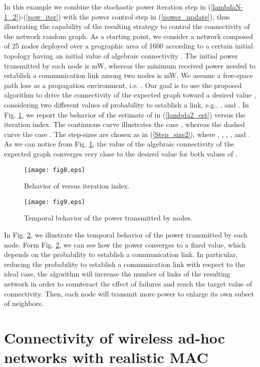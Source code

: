 \documentclass[10pt,twocolumn]{IEEEtran}
\begin{document}
 In this example we combine the stochastic power iteration step in (\ref{lambdaN-1_2})-(\ref{pow_iter}) with the power control step in (\ref{power_update}), thus illustrating the capability of the resulting strategy to control the connectivity of the network random graph.
As a starting point, we consider a network composed of 25 nodes deployed over a geographic area of 1600  according to a certain initial topology having an initial value of algebraic connectivity . The initial power transmitted by each node is  mW, whereas the minimum received power needed to establish a communication link among two nodes is  mW. We assume a free-space path loss as a propagation environment, i.e. . Our goal is to use the proposed algorithm to drive the connectivity of the expected graph toward a desired value , considering two different values of probability to establish a link, e.g., , and . In Fig. \ref{lambda2pc}, we report the behavior of the estimate of  in (\ref{lambda2_est}) versus the iteration index. The continuous curve illustrates the case , whereas the dashed curve the case . The step-sizes are chosen as in (\ref{Step_size2}), where , , , , and . As we can notice from Fig. \ref{lambda2pc}, the value of the algebraic connectivity of the expected graph converges very close to the desired value  for both values of .
\begin{figure}[t]
\centering
\texttt{[image: fig8.eps]}
  \caption{Behavior of  versus iteration index.}\label{lambda2pc}
\end{figure}
\begin{figure}[t]
\centering
\texttt{[image: fig9.eps]}
  \caption{Temporal behavior of the power transmitted by nodes.}\label{sum_power}
\end{figure}
In Fig. \ref{sum_power}, we illustrate the temporal behavior of the power transmitted by each node. Form Fig. \ref{sum_power}, we can see how the power converges to a fixed value, which depends on the probability to establish a communication link. In particular, reducing the probability to establish a communication link with respect to the ideal case, the algorithm will increase the number of links of the resulting network in order to counteract the effect of failures and reach the target value of connectivity. Then, each node will transmit more power to enlarge its own subset of neighbors.


\section{Connectivity of wireless ad-hoc networks with realistic MAC}
\end{document}
